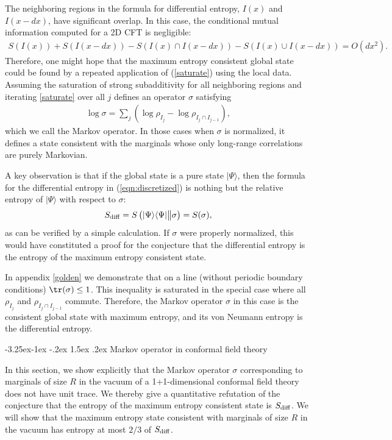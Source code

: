 \documentclass[12pt]{article}
\makeatletter
\newcommand{\la}{\langle}
\newcommand{\ra}{\rangle}
\newcommand{\rb}{\right)}
\newcommand{\lb}{\left(}
\renewcommand\subsection{\@startsection{subsection}{2}{\z@}%
                                     {-3.25ex\@plus -1ex \@minus -.2ex}%
                                     {1.5ex \@plus .2ex}%
                                     {\normalfont\bfseries}}
\def\bea{\begin{eqnarray}}
\def\eea{\end{eqnarray}}
\def\sdiff{S_{\rm diff}}
\makeatother
\begin{document}
The neighboring regions in the formula for differential entropy, $I(x)$ and $I(x-dx)$, have significant overlap. In this case, the conditional mutual information computed for a 2D CFT is negligible:
\bea
S(I(x))+S(I(x-dx))-S(I(x)\cap I(x-dx))-S(I(x)\cup I(x-dx))= O(dx^2).
\eea
Therefore, one might hope that the maximum entropy consistent global state could be found by a repeated application of (\ref{saturate}) using the local data. Assuming the saturation of strong subadditivity for all neighboring regions and iterating \eqref{saturate} over all $j$ defines an operator $\sigma$ satisfying
\bea\label{rho_global}
\log\sigma=\sum_j\lb \log\rho_{I_j}-\log\rho_{I_j\cap I_{j-1}}\rb,
\eea
which we call the Markov operator. In those cases when $\sigma$ is normalized, it defines a state consistent with the marginals whose only long-range correlations are purely Markovian.

A key observation is that if the global state is a pure state $|\Psi\ra$, then the formula for the differential entropy in (\ref{eqn:discretized}) is nothing but the relative entropy of $|\Psi\ra$ with respect to $\sigma$:
\bea
\sdiff=S\left(|\Psi\ra\la\Psi|\big\|\sigma\right)=S(\sigma),
\eea
as can be verified by a simple calculation.
If $\sigma$ were properly normalized, this would have constituted a proof for the conjecture that the differential entropy is the entropy of the maximum entropy consistent state.

In appendix \ref{golden} we demonstrate that on a line (without periodic boundary conditions) $\tr(\sigma)\leq 1$. This inequality is saturated in the special case where all $\rho_{I_j}$ and $\rho_{{I_j}\cap I_{j-1}}$ commute. Therefore, the Markov operator $\sigma$ in this case is the consistent global state with maximum entropy, and its von Neumann entropy is the differential entropy.

\subsection{Markov operator in conformal field theory}

In this section, we show explicitly that the Markov operator $\sigma$ corresponding to marginals of size $R$ in the vacuum of a 1+1-dimensional conformal field theory does not have unit trace. We thereby give a quantitative refutation of the conjecture that the entropy of the maximum entropy consistent state is $\sdiff$. We will show that the maximum entropy state consistent with marginals of size $R$ in the vacuum has entropy at most $2/3$ of $\sdiff$.
\end{document}
